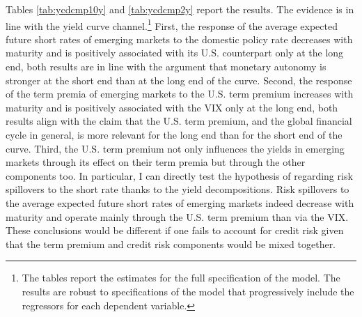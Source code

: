 {Tables \ref{tab:ycdcmp10y} and \ref{tab:ycdcmp2y} report the results.
The evidence is in line with the yield curve channel.\footnote{ The tables report the estimates for the full specification of the model. The results are robust to specifications of the model that progressively include the regressors for each dependent variable.} 
First, the response of the average expected future short rates of emerging markets to the domestic policy rate decreases with maturity and is positively associated with its U.S. counterpart only at the long end, both results are in line with the argument that monetary autonomy is stronger at the short end than at the long end of the curve.
Second, the response of the term premia of emerging markets to the U.S. term premium increases with maturity and is positively associated with the VIX only at the long end, both results align with the claim that the U.S. term premium, and the global financial cycle in general, is more relevant for the long end than for the short end of the curve. 
Third, the U.S. term premium not only influences the yields in emerging markets through its effect on their term premia but through the other components too.
In particular, I can directly test the hypothesis of \cite{Kalemli-Ozcan:2019} regarding risk spillovers to the short rate thanks to the yield decompositions.
Risk spillovers to the average expected future short rates of emerging markets indeed decrease with maturity and operate mainly through 
the U.S. term premium than via the VIX.
These conclusions would be different if one fails to account for credit risk given that the term premium and credit risk components would be mixed together.

%	





}
